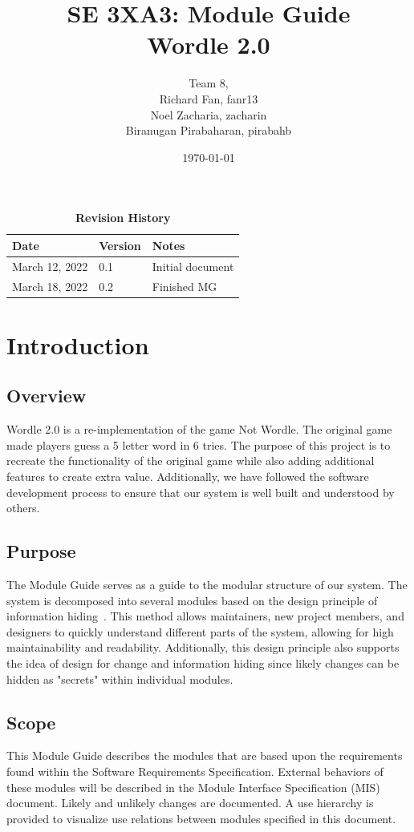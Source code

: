 \documentclass[12pt, titlepage]{article}
\title{SE 3XA3: Module Guide\\ Wordle 2.0}
\author{Team 8,
	\\ Richard Fan, fanr13
	\\ Noel Zacharia, zacharin
	\\ Biranugan Pirabaharan, pirabahb
}
\date{\today}
\begin{document}
	
	\maketitle
	
	\tableofcontents
	\listoftables
	\listoffigures
	
	\begin{table}[bp]
		\caption{\bf Revision History}
		\begin{tabularx}{\textwidth}{p{3cm}p{2cm}X}
			\toprule {\bf Date} & {\bf Version} & {\bf Notes}\\
			\midrule
			March 12, 2022 & 0.1 & Initial document\\
			March 18, 2022 & 0.2 & Finished MG\\
			\bottomrule
		\end{tabularx}
	\end{table}
	
	\newpage
	
	
	\section{Introduction}
	\subsection{Overview}
	Wordle 2.0 is a re-implementation of the game Not Wordle. The original game made players guess a 5 letter word in 6 tries. The purpose of this project is to recreate the functionality of the original game while also adding additional features to create extra value. Additionally, we have followed the software development process to ensure that our system is well built and understood by others. 
	\subsection{Purpose}
	The Module Guide serves as a guide to the modular structure of our system. The system is decomposed into several modules based on the design principle of information hiding~\citep{Parnas1972a}. This method allows maintainers, new project members, and designers to quickly understand different parts of the system, allowing for high maintainability and readability. Additionally, this design principle also supports the idea of design for change and information hiding since likely changes can be hidden as "secrets" within individual modules.
	\subsection{Scope}
	This Module Guide describes the modules that are based upon the requirements found within the Software Requirements Specification. External behaviors of these modules will be described in the Module Interface Specification (MIS) document. Likely and unlikely changes are documented. A use hierarchy is provided to visualize use relations between modules specified in this document.
\end{document}

